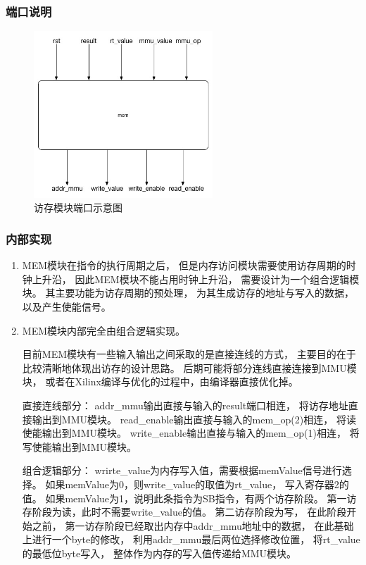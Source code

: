         \subsubsection{端口说明}
            
            \begin{figure}[!hbp]
                \centering
                \caption{访存模块端口示意图}
                \includegraphics[width=0.6\textwidth]{chart/mem.jpg}
            \end{figure}

        \subsubsection{内部实现}
            \begin{enumerate}
            \item
            MEM模块在指令的执行周期之后，%
            但是内存访问模块需要使用访存周期的时钟上升沿，%
            因此MEM模块不能占用时钟上升沿，%
            需要设计为一个组合逻辑模块。%
            其主要功能为访存周期的预处理，%
            为其生成访存的地址与写入的数据，以及产生使能信号。
            \item
            MEM模块内部完全由组合逻辑实现。%

            目前MEM模块有一些输入输出之间采取的是直接连线的方式，%
            主要目的在于比较清晰地体现出访存的设计思路。%
            后期可能将部分连线直接连接到MMU模块，%
            或者在Xilinx编译与优化的过程中，由编译器直接优化掉。

            直接连线部分：%
            addr\_mmu输出直接与输入的result端口相连，%
            将访存地址直接输出到MMU模块。%
            read\_enable输出直接与输入的mem\_op(2)相连，%
            将读使能输出到MMU模块。%
            write\_enable输出直接与输入的mem\_op(1)相连，
            将写使能输出到MMU模块。
        
            组合逻辑部分：%
            wrirte\_value为内存写入值，需要根据memValue信号进行选择。%
            如果memValue为0，则write\_value的取值为rt\_value，%
            写入寄存器2的值。%
            如果memValue为1，说明此条指令为SB指令，有两个访存阶段。%
            第一访存阶段为读，此时不需要write\_value的值。%
            第二访存阶段为写，%
            在此阶段开始之前，%
            第一访存阶段已经取出内存中addr\_mmu地址中的数据，%
            在此基础上进行一个byte的修改，%
            利用addr\_mmu最后两位选择修改位置，%
            将rt\_value的最低位byte写入，%
            整体作为内存的写入值传递给MMU模块。%
        \end{enumerate}
